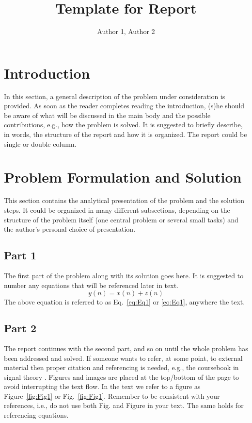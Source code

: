 \documentclass[onecolumn, 12pt]{IEEEtran}
\begin{document}
\title{Template for Report}
\author{Author 1, Author 2}

\maketitle

\section{Introduction}
In this section, a general description of the problem under consideration is provided. 
As soon as the reader completes reading the introduction, (s)he should be aware of what 
will be discussed in the main body and the possible contributions, e.g., how the problem 
is solved. It is suggested to briefly describe, in words, the structure of the report 
and how it is organized. The report could be single or double column.

\section{Problem Formulation and Solution}
This section contains the analytical presentation of the problem and the solution steps. 
It could be organized in many different subsections, depending on the structure of the 
problem itself (one central problem or several small tasks) and the author's personal 
choice of presentation.

\subsection{Part 1}
The first part of the problem along with its solution goes here. It is suggested to number 
any equations that will be referenced later in text.
\begin{equation} \label{eq:Eq1}
y(n)=x(n)+z(n)
\end{equation}
The above equation is referred to as Eq.~\eqref{eq:Eq1} or \eqref{eq:Eq1}, anywhere the text. 

\subsection{Part 2}
The report continues with the second part, and so on until the whole problem has been 
addressed and solved. If someone wants to refer, at some point, to external material 
then proper citation and referencing is needed, e.g., the coursebook in signal theory 
\cite{HanOttHjalm}. Figures and images are placed at the top/bottom of the page to 
avoid interrupting the text flow. In the text we refer to a figure as Figure~\ref{fig:Fig1} 
or Fig.~\ref{fig:Fig1}. Remember to be consistent with your references, i.e., do not 
use both Fig. and Figure in your text. The same holds for referencing equations.
\end{document}
